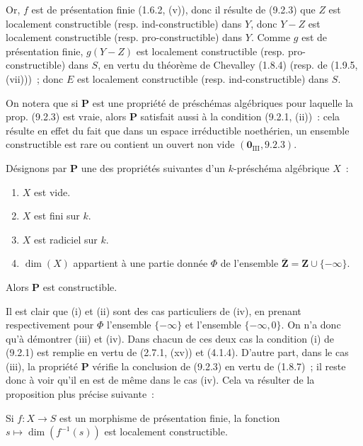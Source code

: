 Or, $f$ est de présentation finie (1.6.2, (v)), donc il résulte de (9.2.3) que
$Z$ est localement constructible (resp. ind-constructible) dans $Y$, donc
$Y-Z$ est localement constructible (resp. pro-constructible) dans $Y$. Comme
$g$ est de présentation finie, $g(Y-Z)$ est localement constructible
(resp. pro-constructible) dans $S$, en vertu du théorème de Chevalley (1.8.4)
(resp. de (1.9.5, (vii)))~; donc $E$ est localement constructible
(resp. ind-constructible) dans $S$.

\begin{remark}[9.2.5]
\label{IV.9.2.5-fr}
On notera que si $\mathbf P$ est une propriété de préschémas algébriques pour
laquelle la prop. (9.2.3) est vraie, alors $\mathbf P$ satisfait aussi à la
condition (9.2.1, (ii))~: cela résulte en effet du fait que dans un espace
irréductible noethérien, un ensemble constructible est rare ou contient un
ouvert non vide $(\mathbf 0_{\mathrm{III}},9.2.3)$.
\end{remark}

\begin{proposition}[9.2.6]
\label{IV.9.2.6-fr}
Désignons par $\mathbf P$ une des propriétés suivantes d'un $k$-préschéma
algébrique $X$~:
\begin{enumerate}[label=(\roman*)]
  \item $X$ est vide.
  \item $X$ est fini sur $k$.
  \item $X$ est radiciel sur $k$.
  \item $\dim(X)$ appartient à une partie donnée $\Phi$ de l'ensemble
  $\overline{\mathbf Z}=\mathbf Z\cup\{-\infty\}$.
\end{enumerate}
Alors $\mathbf P$ est constructible.
\end{proposition}

Il est clair que (i) et (ii) sont des cas particuliers de (iv), en prenant
respectivement pour $\Phi$ l'ensemble $\{-\infty\}$ et l'ensemble
$\{-\infty,0\}$. On n'a donc qu'à démontrer (iii) et (iv). Dans chacun de ces
deux cas la condition (i) de (9.2.1) est remplie en vertu de (2.7.1, (xv)) et
(4.1.4). D'autre part, dans le cas (iii), la propriété $\mathbf P$ vérifie la
conclusion de (9.2.3) en vertu de (1.8.7)~; il reste donc à voir qu'il en est de
même dans le cas (iv). Cela va résulter de la proposition plus précise
suivante~:

\begin{proposition}[9.2.6.1]
\label{IV.9.2.6.1-fr}
Si $f:X\to S$ est un morphisme de présentation finie, la fonction
$s\mapsto\dim(f^{-1}(s))$ est localement constructible.
\end{proposition}

